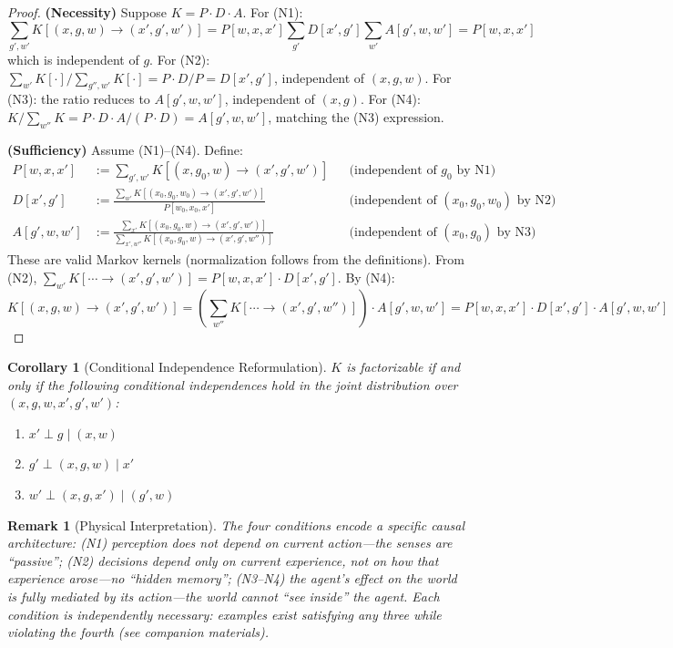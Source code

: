 \documentclass[11pt,a4paper]{article}
\newtheorem{corollary}[theorem]{Corollary}
\newtheorem*{remark}{Remark}
\begin{document}
\begin{proof}
\textbf{(Necessity)} Suppose $K = P \cdot D \cdot A$. For (N1):
\[
\sum_{g', w'} K[(x, g, w) \to (x', g', w')] = P[w, x, x'] \sum_{g'} D[x', g'] \sum_{w'} A[g', w, w'] = P[w, x, x']
\]
which is independent of $g$. For (N2): $\sum_{w'} K[{\cdot}] / \sum_{g'', w'} K[{\cdot}] = P \cdot D / P = D[x', g']$, independent of $(x, g, w)$. For (N3): the ratio reduces to $A[g', w, w']$, independent of $(x, g)$. For (N4): $K / \sum_{w''} K = P \cdot D \cdot A / (P \cdot D) = A[g', w, w']$, matching the (N3) expression.

\textbf{(Sufficiency)} Assume (N1)--(N4). Define:
\begin{align*}
P[w, x, x'] &:= \sum_{g', w'} K[(x, g_0, w) \to (x', g', w')] && \text{(independent of $g_0$ by N1)} \\
D[x', g'] &:= \frac{\sum_{w'} K[(x_0, g_0, w_0) \to (x', g', w')]}{P[w_0, x_0, x']} && \text{(independent of $(x_0, g_0, w_0)$ by N2)} \\
A[g', w, w'] &:= \frac{\sum_{x'} K[(x_0, g_0, w) \to (x', g', w')]}{\sum_{x', w''} K[(x_0, g_0, w) \to (x', g', w'')]} && \text{(independent of $(x_0, g_0)$ by N3)}
\end{align*}
These are valid Markov kernels (normalization follows from the definitions). From (N2), $\sum_{w'} K[\cdots \to (x', g', w')] = P[w, x, x'] \cdot D[x', g']$. By (N4):
\[
K[(x, g, w) \to (x', g', w')] = \left(\sum_{w''} K[\cdots \to (x', g', w'')]\right) \cdot A[g', w, w'] = P[w, x, x'] \cdot D[x', g'] \cdot A[g', w, w']
\]
\end{proof}

\begin{corollary}[Conditional Independence Reformulation]\label{cor:ci-reform}
$K$ is factorizable if and only if the following conditional independences hold in the joint distribution over $(x, g, w, x', g', w')$:
\begin{enumerate}[nosep]
    \item $x' \perp g \mid (x, w)$
    \item $g' \perp (x, g, w) \mid x'$
    \item $w' \perp (x, g, x') \mid (g', w)$
\end{enumerate}
\end{corollary}

\begin{remark}[Physical Interpretation]
The four conditions encode a specific causal architecture: (N1) perception does not depend on current action---the senses are ``passive''; (N2) decisions depend only on current experience, not on how that experience arose---no ``hidden memory''; (N3--N4) the agent's effect on the world is fully mediated by its action---the world cannot ``see inside'' the agent. Each condition is independently necessary: examples exist satisfying any three while violating the fourth (see companion materials).
\end{remark}
\end{document}
